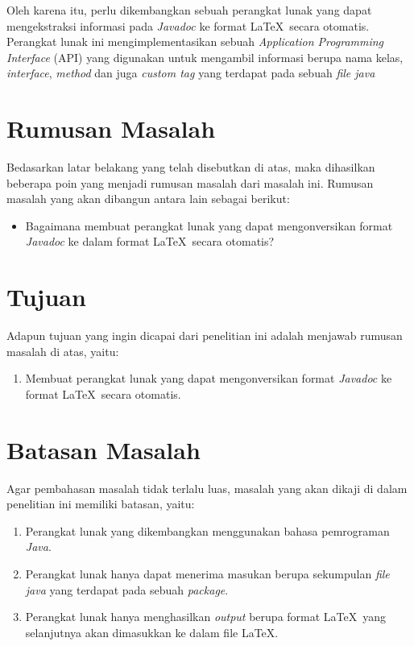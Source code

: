 Oleh karena itu, perlu dikembangkan sebuah perangkat lunak yang dapat mengekstraksi informasi pada {\it Javadoc} ke format \LaTeX\ secara otomatis. Perangkat lunak ini mengimplementasikan sebuah {\it Application Programming Interface} (API) yang digunakan untuk mengambil informasi berupa nama kelas, {\it interface}, {\it method} dan juga {\it custom tag} yang terdapat pada sebuah {\it file java}

\section{Rumusan Masalah}
\label{sec:rumusan}
Bedasarkan latar belakang yang telah disebutkan di atas, maka dihasilkan beberapa poin yang menjadi rumusan masalah dari masalah ini. Rumusan masalah yang akan dibangun antara lain sebagai berikut:
\begin{itemize}
	\item Bagaimana membuat perangkat lunak yang dapat mengonversikan format {\it Javadoc} ke dalam format \LaTeX\ secara otomatis?
\end{itemize}

\section{Tujuan}
\label{sec:tujuan}
Adapun tujuan yang ingin dicapai dari penelitian ini adalah menjawab rumusan masalah di atas, yaitu:
\begin{enumerate}
	\item Membuat perangkat lunak yang dapat mengonversikan format {\it Javadoc} ke format \LaTeX\ secara otomatis.
\end{enumerate}

\section{Batasan Masalah}
\label{sec:batasan}
Agar pembahasan masalah tidak terlalu luas, masalah yang akan dikaji di dalam penelitian ini memiliki batasan, yaitu:
\begin{enumerate}
	\item Perangkat lunak yang dikembangkan menggunakan bahasa pemrograman {\it Java}.
	\item Perangkat lunak hanya dapat menerima masukan berupa sekumpulan {\it file java} yang terdapat pada sebuah {\it package}.
	\item Perangkat lunak hanya menghasilkan {\it output} berupa format \LaTeX\ yang selanjutnya akan dimasukkan ke dalam file \LaTeX.
\end{enumerate}

